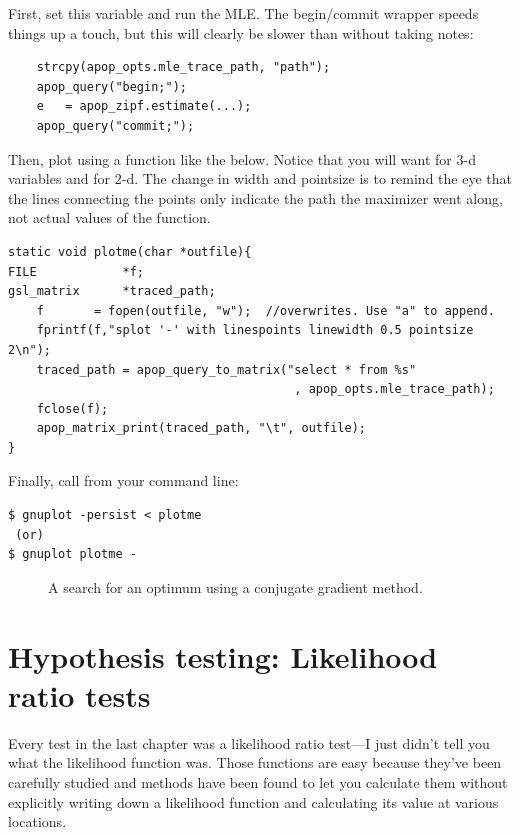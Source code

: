 First, set this variable and run the MLE. The begin/commit wrapper
speeds things up a touch, but this will clearly be slower than without
taking notes:
\begin{lstlisting}
    strcpy(apop_opts.mle_trace_path, "path");
    apop_query("begin;");
    e   = apop_zipf.estimate(...);
    apop_query("commit;");
\end{lstlisting}
Then, plot using a function like the below. Notice that you will want
 for 3-d variables and  for 2-d. The change in width
and pointsize is to remind the eye that the lines connecting the points
only indicate the path the maximizer went along, not actual values of
the function.
\begin{lstlisting}
static void plotme(char *outfile){
FILE            *f;
gsl_matrix      *traced_path;
    f       = fopen(outfile, "w");  //overwrites. Use "a" to append.
    fprintf(f,"splot '-' with linespoints linewidth 0.5 pointsize 2\n");
    traced_path = apop_query_to_matrix("select * from %s"
                                        , apop_opts.mle_trace_path);
    fclose(f);
    apop_matrix_print(traced_path, "\t", outfile);
}
\end{lstlisting}

Finally, call  from your command line:
\begin{lstlisting}
$ gnuplot -persist < plotme
 (or)
$ gnuplot plotme -
\end{lstlisting}

\begin{figure}
\caption{A search for an optimum using a conjugate gradient method.}
\end{figure}

\section{Hypothesis testing: Likelihood ratio tests} Every test
in the last chapter was a likelihood ratio test---I just didn't tell
you what the likelihood function was. Those functions are easy because
they've been carefully studied and methods have been found to let you
calculate them without explicitly writing down a likelihood function
and calculating its value at various locations.


